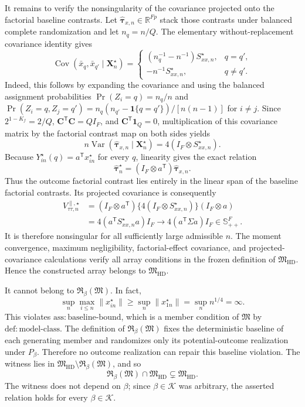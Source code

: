 It remains to verify the nonsingularity of the covariance projected onto
the factorial baseline contrasts.  Let
\(\widehat{\boldsymbol\tau}_{x,n}\in\mathbb R^{Fp}\) stack those contrasts
under balanced complete randomization and let \(n_q=n/Q\).  The elementary
without-replacement covariance identity gives
\[
\operatorname{Cov}(\bar x_q,\bar x_{q'}\mid\mathbf X_n^{\star})
=\begin{cases}
(n_q^{-1}-n^{-1})S_{xx,n}^{\star},&q=q',\\
-n^{-1}S_{xx,n}^{\star},&q\ne q'.
\end{cases}
\]
Indeed, this follows by expanding the covariance and using the balanced
assignment probabilities
\(\Pr(Z_i=q)=n_q/n\) and
\(\Pr(Z_i=q,Z_j=q')=n_q(n_{q'}-\mathbf 1\{q=q'\})/[n(n-1)]\) for
\(i\ne j\).  Since \(2^{1-K_f}=2/Q\),
\(\mathbf C^{\mathsf T}\mathbf C=QI_F\), and
\(\mathbf C^{\mathsf T}\mathbf 1_Q=0\), multiplication of this covariance
matrix by the factorial contrast map on both sides yields
\[
n\operatorname{Var}
 (\widehat{\boldsymbol\tau}_{x,n}\mid\mathbf X_n^{\star})
=4(I_F\otimes S_{xx,n}^{\star}).
\]
Because \(Y_{in}^{\star}(q)=a^{\mathsf T}x_{in}^{\star}\) for every
\(q\), linearity gives the exact relation
\[
\widehat{\boldsymbol\tau}_n^{\star}
=(I_F\otimes a^{\mathsf T})
  \widehat{\boldsymbol\tau}_{x,n}.
\]
Thus the outcome factorial contrast lies entirely in the linear span of the
baseline factorial contrasts.  Its projected covariance is consequently
\[
\begin{aligned}
V_{\tau\tau,n}^{\parallel,\star}
&=(I_F\otimes a^{\mathsf T})
  \{4(I_F\otimes S_{xx,n}^{\star})\}
  (I_F\otimes a)\\
&=4(a^{\mathsf T}S_{xx,n}^{\star}a)I_F
 \longrightarrow4(a^{\mathsf T}\Sigma a)I_F\in\mathbb S_{++}^F.
\end{aligned}
\]
It is therefore nonsingular for all sufficiently large admissible \(n\).
The moment convergence, maximum negligibility, factorial-effect covariance,
and projected-covariance calculations verify all array conditions in the
frozen definition of \(\mathfrak M_{\mathrm{HD}}\).  Hence the constructed
array belongs to \(\mathfrak M_{\mathrm{HD}}\).

It cannot belong to \(\mathfrak R_\beta(\mathfrak M)\).  In fact,
\[
\sup_n\max_{i\le n}\lVert x_{in}^{\star}\rVert
\ge\sup_n\lVert x_{1n}^{\star}\rVert
=\sup_n n^{1/4}=\infty.
\]
This violates \(\mathrm{ass{:}baseline\text{-}bound}\), which is a member
condition of \(\mathfrak M\) by \(\mathrm{def{:}model\text{-}class}\).
The definition of \(\mathfrak R_\beta(\mathfrak M)\) fixes the deterministic
baseline of each generating member and randomizes only its potential-outcome
realization under \(P_\beta\).  Therefore no outcome realization can repair
this baseline violation.  The witness lies in
\(\mathfrak M_{\mathrm{HD}}\setminus\mathfrak R_\beta(\mathfrak M)\), and so
\[
\mathfrak R_\beta(\mathfrak M)\cap\mathfrak M_{\mathrm{HD}}
\subsetneq\mathfrak M_{\mathrm{HD}}.
\]
The witness does not depend on \(\beta\); since \(\beta\in\mathcal K\) was
arbitrary, the asserted relation holds for every \(\beta\in\mathcal K\).
